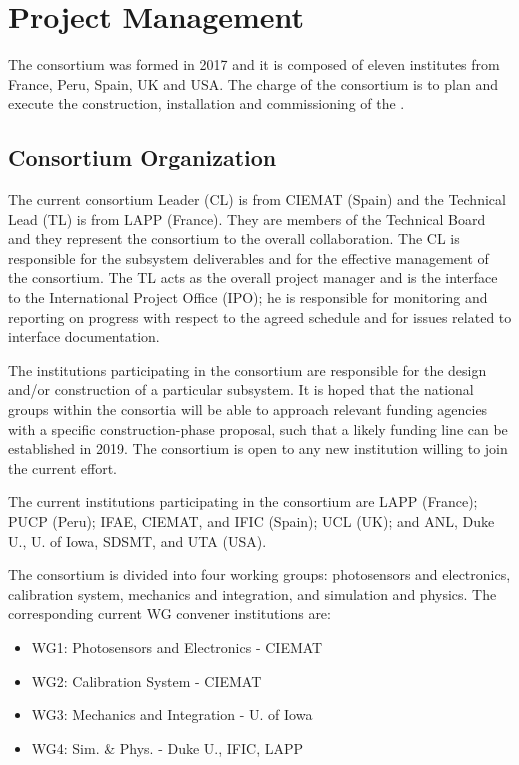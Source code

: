 \section{Project Management}
\label{sec:dp-pds-management}

The \dual {} consortium was formed in 2017 and it is composed of eleven institutes from France, Peru, Spain, UK and USA. The charge of the \dual {} consortium is to plan and execute the construction, installation and commissioning of the  .

\subsection{Consortium Organization}

The current \dual {} consortium Leader (CL) is %
 from CIEMAT (Spain) and the Technical Lead (TL) is %
 from LAPP (France). They are members of the  Technical Board and they represent the consortium to the overall  collaboration. The CL is responsible for the subsystem deliverables and for the effective management of the consortium. The TL acts as the overall project manager and is the interface to the International Project Office (IPO); he is responsible for monitoring and reporting on progress with respect to the agreed schedule and for issues related to interface documentation.

The institutions participating in the consortium are responsible for the design and/or construction of a particular subsystem. It is hoped that the national groups within the consortia will be able to approach relevant funding agencies with a specific construction-phase proposal, such that a likely funding line can be established in 2019. The \dual {} consortium is open to any new institution willing to join the current effort.

The current institutions participating in the \dual {} consortium are LAPP (France); PUCP (Peru); IFAE, CIEMAT, and IFIC (Spain); UCL (UK); and ANL, Duke U., U. of Iowa, SDSMT, and UTA (USA).

The \dual {} consortium is divided into four working groups: photosensors and electronics, calibration system, mechanics and integration, and simulation and physics. The corresponding current WG convener institutions are:
\begin{itemize}
\item WG1: Photosensors and Electronics -  CIEMAT %
\item WG2: Calibration System -  CIEMAT %
\item WG3: Mechanics and Integration - U. of Iowa %
\item WG4: Sim. \& Phys. - %
Duke U., %
IFIC, %
LAPP
\end{itemize}

